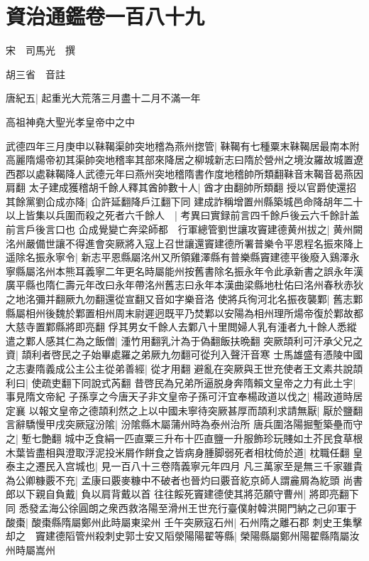 \section{資治通鑑卷一百八十九}


宋　司馬光　撰

胡三省　音註

唐紀五|{
	起重光大荒落三月盡十二月不滿一年}


高祖神堯大聖光孝皇帝中之中

武德四年三月庚申以靺鞨渠帥突地稽為燕州揔管|{
	靺鞨有七種粟末靺鞨居最南本附高麗隋煬帝初其渠帥突地稽率其部來降居之柳城新志曰隋於營州之境汝羅故城置遼西郡以處靺鞨降人武德元年曰燕州突地稽隋書作度地稽帥所類翻靺音末鞨音曷燕因肩翻}
太子建成獲稽胡千餘人釋其酋帥數十人|{
	酋才由翻帥所類翻}
授以官爵使還招其餘黨劉仚成亦降|{
	仚許延翻降戶江翻下同}
建成詐稱增置州縣築城邑命降胡年二十以上皆集以兵圍而殺之死者六千餘人　|{
	考異曰實録前言四千餘戶後云六千餘計盖前言戶後言口也}
仚成覺變亡奔梁師都　行軍總管劉世讓攻竇建德黄州拔之|{
	黄州闕}
洺州嚴備世讓不得進會突厥將入寇上召世讓還竇建德所署普樂令平恩程名振來降上遥除名振永寧令|{
	新志平恩縣屬洺州又所領雞澤縣有普樂縣竇建德平後廢入鷄澤永寧縣屬洺州本熊耳義寧二年更名時屬能州按舊書除名振永年令此承新書之誤永年漢廣平縣也隋仁壽元年改曰永年帶洺州舊志曰永年本漢曲梁縣地杜佑曰洺州春秋赤狄之地洺彌并翻厥九勿翻還從宣翻又音如字樂音洛}
使將兵徇河北名振夜襲鄴|{
	舊志鄴縣屬相州後魏於鄴置相州周末尉遲迥既平乃焚鄴以安陽為相州理所煬帝復於鄴故都大慈寺置鄴縣將即亮翻}
俘其男女千餘人去鄴八十里閲婦人乳有湩者九十餘人悉縱遣之鄴人感其仁為之飯僧|{
	湩竹用翻乳汁為于偽翻飯扶晩翻}
突厥頡利可汗承父兄之資|{
	頡利者啓民之子始畢處羅之弟厥九勿翻可從刋入聲汗音寒}
士馬雄盛有憑陵中國之志妻隋義成公主公主從弟善經|{
	從才用翻}
避亂在突厥與王世充使者王文素共說頡利曰|{
	使疏吏翻下同說式芮翻}
昔啓民為兄弟所逼脱身奔隋賴文皇帝之力有此土宇|{
	事見隋文帝紀}
子孫享之今唐天子非文皇帝子孫可汗宜奉楊政道以伐之|{
	楊政道時居定襄}
以報文皇帝之德頡利然之上以中國未寧待突厥甚厚而頡利求請無厭|{
	厭於鹽翻}
言辭驕慢甲戌突厥寇汾隂|{
	汾隂縣木屬蒲州時為泰州治所}
唐兵圍洛陽掘塹築壘而守之|{
	塹七艶翻}
城中乏食絹一匹直粟三升布十匹直鹽一升服飾珍玩賤如土芥民食草根木葉皆盡相與澄取浮泥投米屑作餅食之皆病身腫脚弱死者相枕倚於道|{
	枕職任翻}
皇泰主之遷民入宫城也|{
	見一百八十三卷隋義寧元年四月}
凡三萬家至是無三千家雖貴為公卿糠覈不充|{
	孟康曰覈麥糠中不破者也晉灼曰覈音紇京師人謂麄屑為紇頭}
尚書郎以下親自負戴|{
	負以肩背戴以首}
往往餒死竇建德使其將范願守曹州|{
	將即亮翻下同}
悉發孟海公徐圓朗之衆西救洛陽至滑州王世充行臺僕射韓洪開門納之己卯軍于酸棗|{
	酸棗縣隋屬鄭州此時屬東梁州}
壬午突厥寇石州|{
	石州隋之離石郡}
刺史王集擊却之　竇建德䧟管州殺刺史郭士安又䧟滎陽陽翟等縣|{
	榮陽縣屬鄭州陽翟縣隋屬汝州時屬嵩州}
